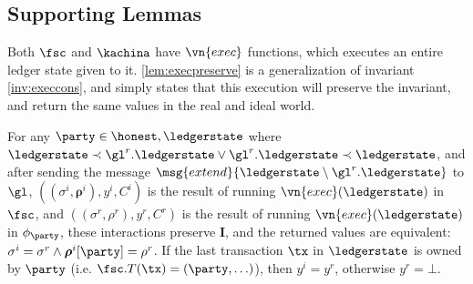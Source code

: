 \subsection{Supporting Lemmas}

Both $\fsc$ and $\kachina$ have $\vn{exec}$ functions, which executes an entire
ledger state given to it. \autoref{lem:execpreserve} is a generalization of
invariant \ref{inv:execcons}, and simply states that this execution will
preserve the invariant, and return the same values in the real and ideal world.

\begin{lemma}
  For any $\party \in \honest, \ledgerstate$ where $\ledgerstate \prec
  \gl^r.\ledgerstate \lor \gl^r.\ledgerstate \prec \ledgerstate$, and after
  sending the message $\msg{extend}{\ledgerstate \setminus \gl^r.\ledgerstate}$ to $\gl$,
  $((\sigma^i, \boldsymbol\rho^i), y^i, C^i)$ is the result of running
  $\vn{exec}(\ledgerstate)$ in $\fsc$, and $((\sigma^r, \rho^r),
  y^r, C^r)$ is the result of running $\vn{exec}(\ledgerstate)$ in
  $\phi_\party$, these interactions preserve $\boldsymbol I$, and the returned
  values are equivalent: $\sigma^i = \sigma^r \land \boldsymbol\rho^i[\party] =
  \rho^r$. If the last transaction $\tx$ in $\ledgerstate$ is owned by $\party$
  (i.e. $\fsc.T(\tx) = (\party, \ldots)$), then $y^i = y^r$,
  otherwise $y^r = \bot$.
  \label{lem:execpreserve}
\end{lemma}

